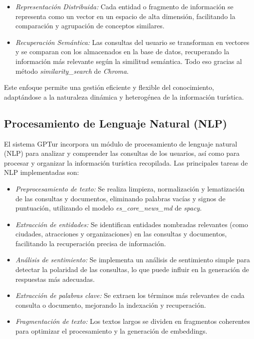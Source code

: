 \documentclass[10pt]{llncs}
\begin{document}
\begin{itemize}
    \item \textit{Representación Distribuida:} Cada entidad o fragmento de información se representa como un vector en un espacio de alta dimensión, facilitando la comparación y agrupación de conceptos similares.
    \item \textit{Recuperación Semántica:} Las consultas del usuario se transforman en vectores y se comparan con los almacenados en la base de datos, recuperando la información más relevante según la similitud semántica. Todo 
    eso gracias al método \textit{similarity\_search} de \textit{Chroma}.
\end{itemize}

Este enfoque permite una gestión eficiente y flexible del conocimiento, adaptándose a la naturaleza dinámica y heterogénea de la información turística.

\vspace{\baselineskip}
\subsection{Procesamiento de Lenguaje Natural (NLP)}

El sistema GPTur incorpora un módulo de procesamiento de lenguaje natural (NLP) para analizar y comprender las consultas de los usuarios, así como para procesar y organizar la información turística recopilada. Las principales tareas de 
NLP implementadas son:

\begin{itemize}
    \item \textit{Preprocesamiento de texto:} Se realiza limpieza, normalización y lematización de las consultas y documentos, eliminando palabras vacías y signos de puntuación, utilizando el modelo \textit{es\_core\_news\_md} de \textit{spacy}.
    \item \textit{Extracción de entidades:} Se identifican entidades nombradas relevantes (como ciudades, atracciones y organizaciones) en las consultas y documentos, facilitando la recuperación precisa de información.
    \item \textit{Análisis de sentimiento:} Se implementa un análisis de sentimiento simple para detectar la polaridad de las consultas, lo que puede influir en la generación de respuestas más adecuadas.
    \item \textit{Extracción de palabras clave:} Se extraen los términos más relevantes de cada consulta o documento, mejorando la indexación y recuperación.
    \item \textit{Fragmentación de texto:} Los textos largos se dividen en fragmentos coherentes para optimizar el procesamiento y la generación de embeddings.
\end{itemize}
\end{document}
